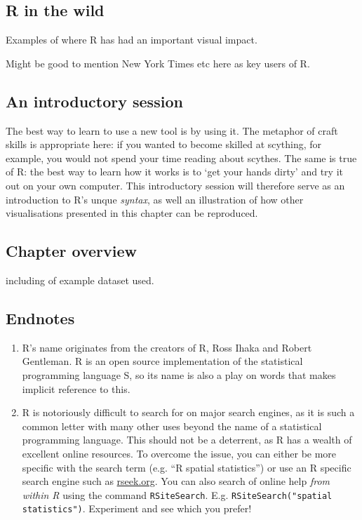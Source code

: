 \documentclass[]{article}
\begin{document}
\subsection{R in the wild}

Examples of where R has had an important visual impact.

Might be good to mention New York Times etc here as key users of R.

\subsection{An introductory session}

The best way to learn to use a new tool is by using it. The metaphor of
craft skills is appropriate here: if you wanted to become skilled at
scything, for example, you would not spend your time reading about
scythes. The same is true of R: the best way to learn how it works is to
`get your hands dirty' and try it out on your own computer. This
introductory session will therefore serve as an introduction to R's
unque \emph{syntax}, as well an illustration of how other visualisations
presented in this chapter can be reproduced.

\subsection{Chapter overview}

including of example dataset used.

\subsection{Endnotes}

\begin{enumerate}
\def\labelenumi{\arabic{enumi}.}
\item
  R's name originates from the creators of R, Ross Ihaka and Robert
  Gentleman. R is an open source implementation of the statistical
  programming language S, so its name is also a play on words that makes
  implicit reference to this.
\item
  R is notoriously difficult to search for on major search engines, as
  it is such a common letter with many other uses beyond the name of a
  statistical programming language. This should not be a deterrent, as R
  has a wealth of excellent online resources. To overcome the issue, you
  can either be more specific with the search term (e.g. ``R spatial
  statistics'') or use an R specific search engine such as
  \href{http://www.rseek.org/}{rseek.org}. You can also search of online
  help \emph{from within R} using the command \texttt{RSiteSearch}. E.g.
  \texttt{RSiteSearch("spatial statistics")}. Experiment and see which
  you prefer!
\end{enumerate}
\end{document}
